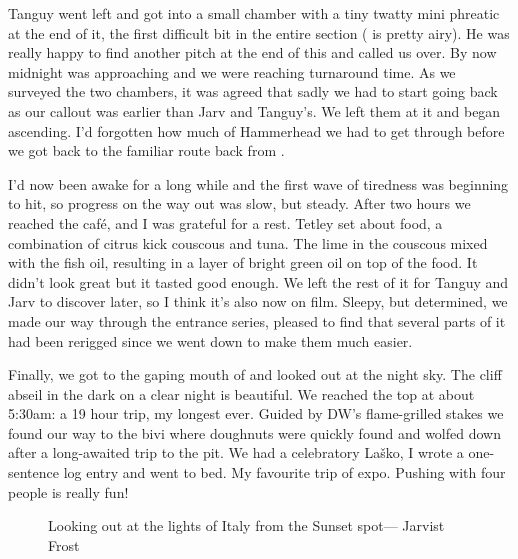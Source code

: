 Tanguy went left and got into a small chamber with a tiny twatty mini phreatic at the end of it, the first difficult bit in the entire section ( is pretty airy). He was really happy to find another pitch at the end of this and called us over. By now midnight was approaching and we were reaching turnaround time. As we surveyed the two chambers, it was agreed that sadly we had to start going back as our callout was earlier than Jarv and Tanguy’s. We left them at it and began ascending. I’d forgotten how much of Hammerhead we had to get through before we got back to the familiar route back from .

I’d now been awake for a long while and the first wave of tiredness was beginning to hit, so progress on the way out was slow, but steady. After two hours we reached the café, and I was grateful for a rest. Tetley set about food, a combination of citrus kick couscous and tuna. The lime in the couscous mixed with the fish oil, resulting in a layer of bright green oil on top of the food. It didn’t look great but it tasted good enough. We left the rest of it for Tanguy and Jarv to discover later, so I think it’s also now on film.  Sleepy, but determined, we made our way through the entrance series, pleased to find that several parts of it had been rerigged since we went down to make them much easier. 

Finally, we got to the gaping mouth of  and looked out at the night sky. The cliff abseil in the dark on a clear night is beautiful. We reached the top at about 5:30am: a 19 hour trip, my longest ever. Guided by DW’s flame-grilled stakes we found our way to the bivi where doughnuts were quickly found and wolfed down after a long-awaited trip to the pit. We had a celebratory Laško, I wrote a one-sentence log entry and went to bed. My favourite trip of expo. Pushing with four people is really fun!


\begin{figure*}[h!]
	\checkoddpage \ifoddpage \forcerectofloat \else \forceversofloat \fi
	\centering
  	\caption{Looking out at the lights of Italy from the Sunset spot--- Jarvist Frost}
\end{figure*}
